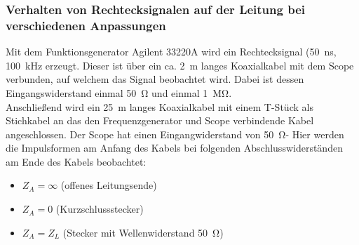 \documentclass[a4paper,twoside,final]{article}
\begin{document}
\subsubsection{Verhalten von Rechtecksignalen auf der Leitung bei verschiedenen Anpassungen}
Mit dem Funktionsgenerator Agilent 33220A wird ein Rechtecksignal (\SI{50}{\nano\second}, \SI{100}{\kilo\hertz} erzeugt. Dieser ist über ein ca. \SI{2}{\meter} langes Koaxialkabel mit dem Scope verbunden, auf welchem das Signal beobachtet wird. Dabei ist dessen Eingangswiderstand einmal  \SI{50}{\ohm} und einmal \SI{1}{\mega\ohm}.
 \\
Anschließend wird ein \SI{25}{\meter} langes Koaxialkabel mit einem T-Stück als Stichkabel an das den Frequenzgenerator und Scope verbindende Kabel angeschlossen. Der Scope hat einen Eingangwiderstand von \SI{50}{\ohm}- Hier werden die Impulsformen am Anfang des Kabels bei folgenden Abschlusswiderständen am Ende des Kabels beobachtet:
\begin{itemize}
  \item $Z_A = \infty$ (offenes Leitungsende)
  \item $Z_A = 0$ (Kurzschlussstecker)
  \item $Z_A = Z_L$ (Stecker mit Wellenwiderstand \SI{50}{\ohm})

\end{itemize}
\end{document}
